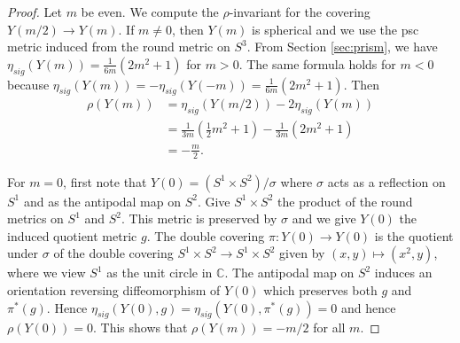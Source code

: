 \documentclass{amsart}
\theoremstyle{definition}
\theoremstyle{remark}
\numberwithin{equation}{section}
\begin{document}
\begin{proof}
Let $m$ be even. We compute the $\rho$-invariant for the covering $Y(m/2) \to Y(m)$. If $m \neq 0$, then $Y(m)$ is spherical and we use the psc metric induced from the round metric on $S^3$. From Section \ref{sec:prism}, we have $\eta_{sig}(Y(m)) = \frac{1}{6m}(2m^2+1)$ for $m>0$. The same formula holds for $m<0$ because $\eta_{sig}(Y(m)) = -\eta_{sig}(Y(-m)) = \frac{1}{6m}(2m^2+1)$. Then
\begin{align*}
\rho(Y(m)) &= \eta_{sig}(Y(m/2)) - 2\eta_{sig}(Y(m)) \\
&= \frac{1}{3m}(\frac{1}{2}m^2 + 1) - \frac{1}{3m}(2m^2+1) \\
&= -\frac{m}{2}.
\end{align*}

For $m=0$, first note that $Y(0) = (S^1 \times S^2) / \sigma$ where $\sigma$ acts as a reflection on $S^1$ and as the antipodal map on $S^2$. Give $S^1 \times S^2$ the product of the round metrics on $S^1$ and $S^2$. This metric is preserved by $\sigma$ and we give $Y(0)$ the induced quotient metric $g$. The double covering $\pi : Y(0) \to Y(0)$ is the quotient under $\sigma$ of the double covering $S^1 \times S^2 \to S^1 \times S^2$ given by $(x,y) \mapsto (x^2 , y)$, where we view $S^1$ as the unit circle in $\mathbb{C}$. The antipodal map on $S^2$ induces an orientation reversing diffeomorphism of $Y(0)$ which preserves both $g$ and $\pi^*(g)$. Hence $\eta_{sig}(Y(0) , g) = \eta_{sig}(Y(0) , \pi^*(g)) = 0$ and hence $\rho(Y(0)) = 0$. This shows that $\rho(Y(m)) = -m/2$ for all $m$.


\end{proof}
\end{document}
